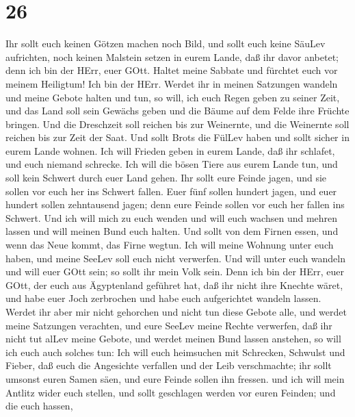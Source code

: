 \hypertarget{section-25}{%
\section{26}\label{section-25}}

 Ihr sollt euch keinen Götzen machen noch Bild, und sollt
euch keine SäuLev aufrichten, noch keinen Malstein setzen in eurem
Lande, daß ihr davor anbetet; denn ich bin der HErr, euer GOtt.
 Haltet meine Sabbate und fürchtet euch vor meinem
Heiligtum! Ich bin der HErr.  Werdet ihr in meinen Satzungen
wandeln und meine Gebote halten und tun,  so will, ich euch
Regen geben zu seiner Zeit, und das Land soll sein Gewächs geben und die
Bäume auf dem Felde ihre Früchte bringen.  Und die
Dreschzeit soll reichen bis zur Weinernte, und die Weinernte soll
reichen bis zur Zeit der Saat. Und sollt Brots die FülLev haben und
sollt sicher in eurem Lande wohnen.  Ich will Frieden geben
in eurem Lande, daß ihr schlafet, und euch niemand schrecke. Ich will
die bösen Tiere aus eurem Lande tun, und soll kein Schwert durch euer
Land gehen.  Ihr sollt eure Feinde jagen, und sie sollen vor
euch her ins Schwert fallen.  Euer fünf sollen hundert
jagen, und euer hundert sollen zehntausend jagen; denn eure Feinde
sollen vor euch her fallen ins Schwert.  Und ich will mich
zu euch wenden und will euch wachsen und mehren lassen und will meinen
Bund euch halten.  Und sollt von dem Firnen essen, und wenn
das Neue kommt, das Firne wegtun.  Ich will meine Wohnung
unter euch haben, und meine SeeLev soll euch nicht verwerfen.
 Und will unter euch wandeln und will euer GOtt sein; so
sollt ihr mein Volk sein.  Denn ich bin der HErr, euer
GOtt, der euch aus Ägyptenland geführet hat, daß ihr nicht ihre Knechte
wäret, und habe euer Joch zerbrochen und habe euch aufgerichtet wandeln
lassen.  Werdet ihr aber mir nicht gehorchen und nicht tun
diese Gebote alle,  und werdet meine Satzungen verachten,
und eure SeeLev meine Rechte verwerfen, daß ihr nicht tut alLev meine
Gebote, und werdet meinen Bund lassen anstehen,  so will
ich euch auch solches tun: Ich will euch heimsuchen mit Schrecken,
Schwulst und Fieber, daß euch die Angesichte verfallen und der Leib
verschmachte; ihr sollt umsonst euren Samen säen, und eure Feinde sollen
ihn fressen.  und ich will mein Antlitz wider euch stellen,
und sollt geschlagen werden vor euren Feinden; und die euch hassen,
